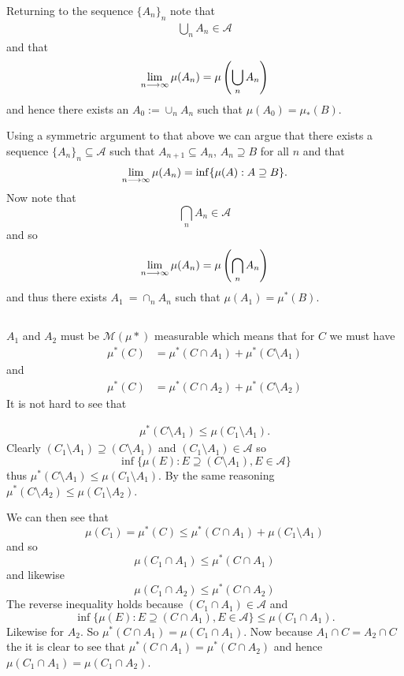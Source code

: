 \documentclass{unswmaths}
\begin{document}
Returning to the sequence $ \{ A_n \}_n $ note that 
\begin{align*}
    \bigcup_{n} A_n \in \mathcal{A} 
\end{align*} 
and that
\begin{align*}
    \lim_{n\longrightarrow\infty} \mu(A_n) = \mu\left( \bigcup_n A_n \right)    
\end{align*}
and hence there exists an $ A_0 := \cup_{n} A_n $ such that $ \mu(A_0) = \mu_{*}(B) $.

Using a symmetric argument to that above we can argue that there exists a sequence
$ \{ A_n \}_n \subseteq \mathcal{A} $ such that $ A_{n+1} \subseteq A_n $, $ A_n \supseteq B $ for all $ n $ and that 
$$ \lim_{n \longrightarrow \infty} \mu(A_n) = \inf\{ \mu(A) : A \supseteq B \}. $$
Now note that
$$
    \bigcap_{n} A_n \in \mathcal{A}
$$
and so
$$
    \lim_{n \longrightarrow \infty} \mu(A_n) = \mu\left( \bigcap_n A_n \right)
$$
and thus there exists $ A_1 \:= \cap_n A_n $ such that $ \mu(A_1) = \mu^*(B) $.
\subsection{}
$ A_1 $ and $ A_2 $ must be $\mathcal{M}( \mu*) $ measurable which means that for $ C $ we must have
\begin{align*}
    \mu^*(C) &= \mu^*(C \cap A_1) + \mu^*(C \setminus A_1 ) 
\end{align*}
and
\begin{align*}
    \mu^*(C) &= \mu^*(C \cap A_2) + \mu^*(C \setminus A_2) 
\end{align*}
It is not hard to see that

\begin{align*}
   \mu^*(C \setminus A_1) \leq \mu(C_1 \setminus A_1).
\end{align*}
Clearly $ (C_1 \setminus A_1) \supseteq (C \setminus A_1) $ and $ (C_1 \setminus A_1) \in \mathcal{A} $ so
$$ \inf\{ \mu(E) : E \supseteq (C \setminus A_1), E \in \mathcal{A} \} $$
thus $ \mu^*(C \setminus A_1) \leq \mu(C_1 \setminus A_1) $. By the same reasoning $ \mu^*(C \setminus A_2) \leq \mu(C_1 \setminus A_2) $. 

We can then see that
$$
    \mu(C_1) = \mu^*(C) \leq \mu^*(C\cap A_1) + \mu(C_1 \setminus A_1 )
$$
and so
$$
    \mu(C_1 \cap A_1) \leq \mu^*(C \cap A_1)
$$
and likewise
$$
    \mu(C_1 \cap A_2) \leq \mu^*(C \cap A_2)
$$
The reverse inequality holds because $ (C_1 \cap A_1) \in \mathcal{A} $ and 
$$ \inf\{ \mu(E) : E \supseteq (C \cap A_1), E \in \mathcal{A} \} \leq \mu(C_1 \cap A_1). $$
Likewise for $ A_2 $. So $ \mu^*(C \cap A_1) = \mu( C_1 \cap A_1 )$. Now because $ A_1\cap C = A_2\cap C $ the  it is clear to see
that $ \mu^*(C \cap A_1) = \mu^*( C \cap A_2) $ and hence $ \mu(C_1 \cap A_1) = \mu(C_1 \cap A_2) $.
\end{document}

